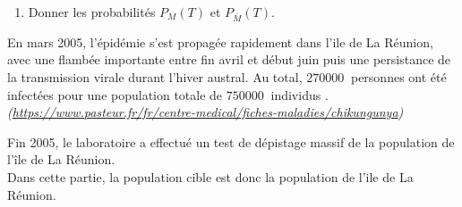 \documentclass[10pt]{article}
\providecommand{\np}[2][]{{#2~#1}}
\begin{document}
\begin{enumerate}
\item Donner les probabilités $P_{M}(T)$ et $P_{\overline{M}}(T)$.
\end{enumerate} 

\og En mars 2005, l'épidémie s'est propagée rapidement dans l'ile de La Réunion, avec une flambée importante entre fin avril et début juin puis une persistance de la transmission virale durant l'hiver austral. Au total, $\np{270000}$ personnes ont été infectées pour une population totale de $\np{750000}$ individus \fg{}.\\
\emph{(\href{https://www.pasteur.fr/fr/centre-medical/fiches-maladies/chikungunya}{https://www.pasteur.fr/fr/centre-medical/fiches-maladies/chikungunya})}

Fin 2005, le laboratoire a effectué un test de dépistage massif de la population de l'île de La Réunion.\\
 Dans cette partie, la population cible est donc la population de l'ile de La Réunion.
\end{document}
